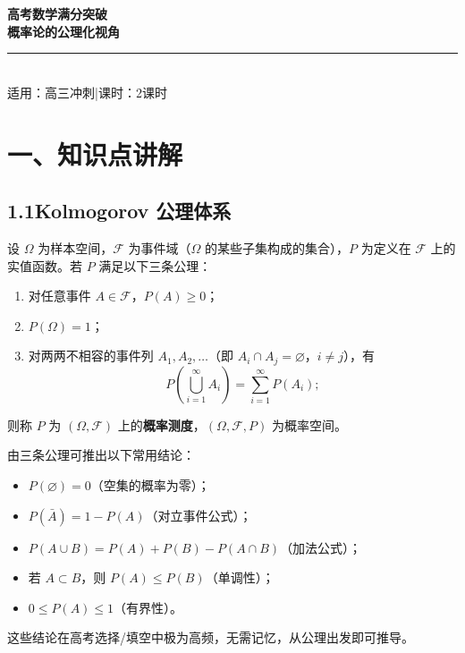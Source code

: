 \documentclass[12pt, a4paper]{ctexart}
\begin{document}
\begin{center}
{\Huge\bfseries\textcolor{mainblue}{高考数学满分突破}}\\[6pt]
{\LARGE\bfseries\textcolor{mainblue}{概率论的公理化视角}}\\[12pt]
\rule{0.6\textwidth}{1pt}\\[8pt]
{\normalsize 适用：高三冲刺\quad |\quad 课时：2课时}
\end{center}
\vspace{10pt}

\section*{\textcolor{mainblue}{一、知识点讲解}}

\subsection*{1.1\quad Kolmogorov 公理体系}

\begin{knowledgebox}
设 $\Omega$ 为样本空间，$\mathcal{F}$ 为事件域（$\Omega$ 的某些子集构成的集合），$P$ 为定义在 $\mathcal{F}$ 上的实值函数。若 $P$ 满足以下三条公理：\par
\begin{enumerate}[leftmargin=2em]
  \item[\textbf{公理1}（非负性）] 对任意事件 $A\in\mathcal{F}$，$P(A)\geq 0$；
  \item[\textbf{公理2}（规范性）] $P(\Omega)=1$；
  \item[\textbf{公理3}（可列可加性）] 对两两不相容的事件列 $A_1,A_2,\dots$（即 $A_i\cap A_j=\varnothing$，$i\neq j$），有
  \[
  P\!\left(\bigcup_{i=1}^{\infty}A_i\right)=\sum_{i=1}^{\infty}P(A_i);
  \]
\end{enumerate}
则称 $P$ 为 $(\Omega,\mathcal{F})$ 上的\textbf{概率测度}，$(\Omega,\mathcal{F},P)$ 为概率空间。
\end{knowledgebox}

\begin{tipbox}[高考中的直接推论]
由三条公理可推出以下常用结论：\par
\begin{itemize}[leftmargin=1.5em]
  \item $P(\varnothing)=0$（空集的概率为零）；
  \item $P(\bar{A})=1-P(A)$（对立事件公式）；
  \item $P(A\cup B)=P(A)+P(B)-P(A\cap B)$（加法公式）；
  \item 若 $A\subset B$，则 $P(A)\leq P(B)$（单调性）；
  \item $0\leq P(A)\leq 1$（有界性）。
\end{itemize}
这些结论在高考选择/填空中极为高频，无需记忆，从公理出发即可推导。
\end{tipbox}
\end{document}
